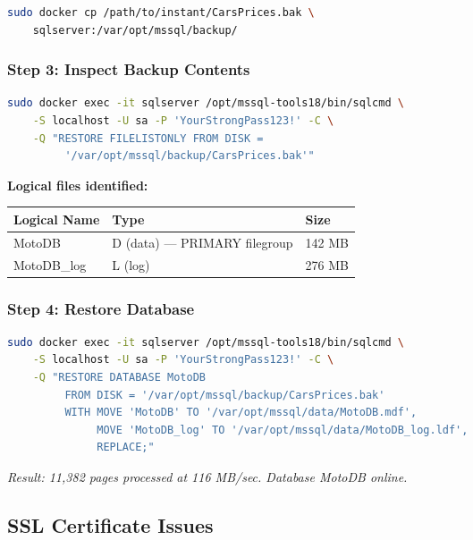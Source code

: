 \documentclass[12pt,a4paper]{article}
\begin{document}
\begin{lstlisting}[language=bash]
sudo docker cp /path/to/instant/CarsPrices.bak \
    sqlserver:/var/opt/mssql/backup/
\end{lstlisting}

\subsubsection{Step 3: Inspect Backup Contents}

\begin{lstlisting}[language=bash]
sudo docker exec -it sqlserver /opt/mssql-tools18/bin/sqlcmd \
    -S localhost -U sa -P 'YourStrongPass123!' -C \
    -Q "RESTORE FILELISTONLY FROM DISK = 
         '/var/opt/mssql/backup/CarsPrices.bak'"
\end{lstlisting}

\textbf{Logical files identified:}
\begin{center}
\begin{tabular}{lll}
\toprule
\textbf{Logical Name} & \textbf{Type} & \textbf{Size} \\
\midrule
MotoDB & D (data) --- PRIMARY filegroup & 142 MB \\
MotoDB\_log & L (log) & 276 MB \\
\bottomrule
\end{tabular}
\end{center}

\subsubsection{Step 4: Restore Database}

\begin{lstlisting}[language=bash]
sudo docker exec -it sqlserver /opt/mssql-tools18/bin/sqlcmd \
    -S localhost -U sa -P 'YourStrongPass123!' -C \
    -Q "RESTORE DATABASE MotoDB 
         FROM DISK = '/var/opt/mssql/backup/CarsPrices.bak'
         WITH MOVE 'MotoDB' TO '/var/opt/mssql/data/MotoDB.mdf',
              MOVE 'MotoDB_log' TO '/var/opt/mssql/data/MotoDB_log.ldf',
              REPLACE;"
\end{lstlisting}

\textit{Result: 11,382 pages processed at 116 MB/sec. Database MotoDB online.}

\subsection{SSL Certificate Issues}
\end{document}
